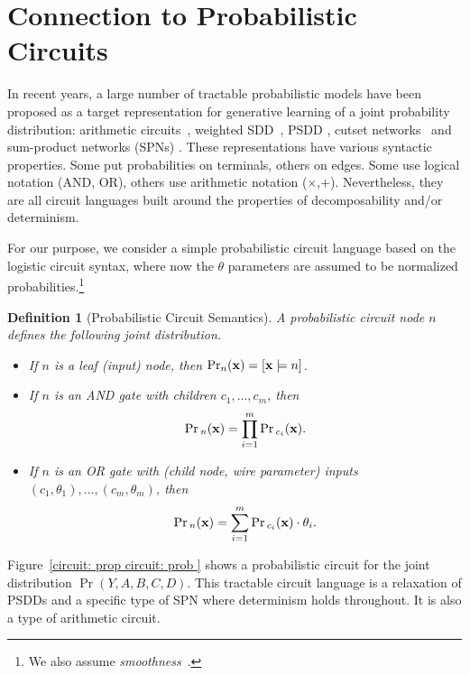 \documentclass[letterpaper]{article} %
\newtheorem{definition}{Definition}
\newcommand{\node}{n}
\newcommand{\sample}{{\bf x}}
\begin{document}
\section{Connection to Probabilistic Circuits} \label{s:generativeconnection}
In recent years, a large number of tractable probabilistic models have been proposed as a target representation for generative learning of a joint probability distribution: arithmetic circuits~\cite{lowd:uai08}, weighted SDD~\cite{BekkerNIPS15}, PSDD \cite{KisaVCD14}, cutset networks~\cite{rahman2014cutset} and sum-product networks (SPNs) \cite{poon2011sum}.
These representations have various syntactic properties. Some put probabilities on terminals, others on edges. Some use logical notation (AND, OR), others use arithmetic notation ($\times$,$+$).
Nevertheless, they are all circuit languages built around the properties of decomposability and/or determinism.

For our purpose, we consider a simple probabilistic circuit language based on the logistic circuit syntax, where now the $\theta$ parameters are assumed to be  normalized probabilities.\footnote{We also assume \emph{smoothness}~\cite{darwicheJAIR02}.}
\begin{definition}[Probabilistic Circuit Semantics]
\label{de: probabilistic circuit semantics}
A probabilistic circuit node $n$ defines the following joint distribution.
\begin{itemize}
\item[--] If $\node$ is a leaf (input) node, then $\Pr_n(\sample) =[\sample \models n]$.

\item[--] If $\node$ is an AND gate with children $c_1,\dots,c_m$, then
\begin{align*}
\Pr{_n}(\sample) =  \prod_{i=1}^m \Pr{_{c_i}}(\sample).
\end{align*}

\item[--] If $\node$ is an OR gate with (child node, wire parameter) inputs $(c_1,\theta_1),\dots, (c_m, \theta_m)$, then
\begin{align*}
\Pr{_n}({\bf x}) =    \sum_{i=1}^m  \Pr{_{c_i}}(\sample)\cdot \theta_i.
\end{align*}
\end{itemize}
\end{definition}

Figure~\ref{circuit: prop circuit: prob } shows a probabilistic circuit for the joint distribution $\Pr(Y,A,B,C,D)$. This tractable circuit language is a relaxation of PSDDs \cite{KisaVCD14} and a specific type of SPN \cite{poon2011sum} where determinism holds throughout. It is also a type of arithmetic circuit.
\end{document}

